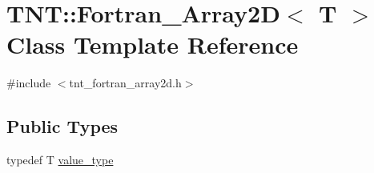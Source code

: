 \hypertarget{classTNT_1_1Fortran__Array2D}{\section{T\-N\-T\-:\-:Fortran\-\_\-\-Array2\-D$<$ T $>$ Class Template Reference}
\label{classTNT_1_1Fortran__Array2D}
}


{\ttfamily \#include $<$tnt\-\_\-fortran\-\_\-array2d.\-h$>$}

\subsection*{Public Types}
\begin{DoxyCompactItemize}
\item 
typedef T \hyperlink{classTNT_1_1Fortran__Array2D_a498268efd59880dbd352e67e283ea042}{value\-\_\-type}
\end{DoxyCompactItemize}
